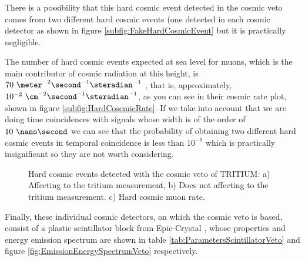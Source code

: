 There is a possibility that this hard cosmic event detected in the cosmic veto comes from two different hard cosmic events (one detected in each cosmic detector as shown in figure \ref{subfig:FakeHardCosmicEvent} but it is practically negligible.

The number of hard cosmic events expected at sea level for muons, which is the main contributor of cosmic radiation at this height, is $70~\meter^{-2}\second^{-1}\steradian^{-1}$ \cite{PDG}\cite{HardCosmicMuonRate}, that is, approximately, $10^{-2}~\cm^{-2}\second^{-1}\steradian^{-1}$, as you can see in their cosmic rate plot, shown in figure \ref{subfig:HardCoscmicRate}. If we take into account that we are doing time coincidences with signals whose width is of the order of $10~\nano\second$ we can see that the probability of obtaining two different hard cosmic events in temporal coincidence is less than $10^{-9}$ which is practically insignificant so they are not worth considering.

\begin{figure}[h]
 \centering
 \caption{Hard cosmic events detected with the cosmic veto of TRITIUM: a) Affecting to the tritium measurement, b) Does not affecting to the tritium measurement. c) Hard cosmic muon rate. }
 \label{fig:HardCosmicEventsSimulation}
\end{figure}

Finally, these individual cosmic detectors, on which the cosmic veto is based, consist of a plastic scintillator block from Epic-Crystal \cite{ScintillatorVeto}, whose properties and energy emission spectrum are shown in table \ref{tab:ParametersScintillatorVeto} and figure \ref{fig:EmissionEnergySpectrumVeto} respectively.

